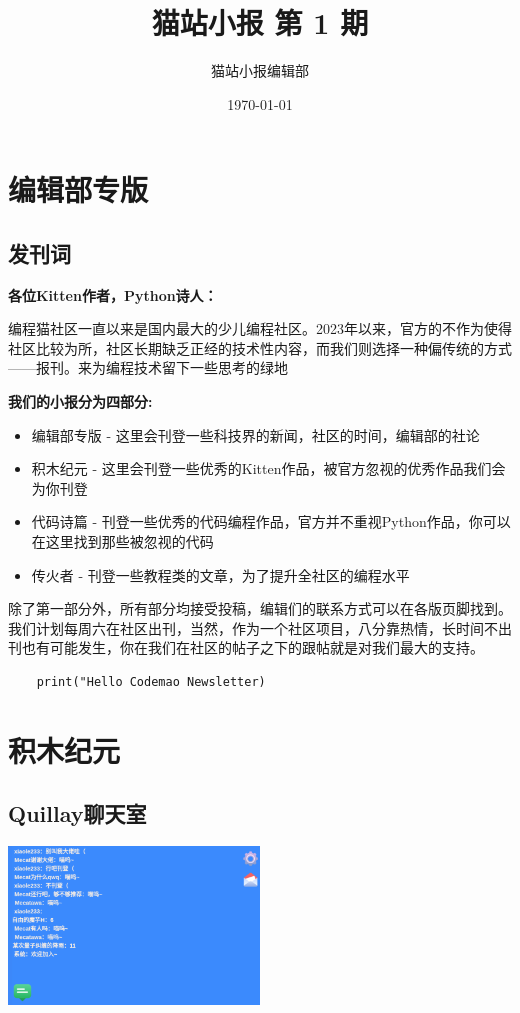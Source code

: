 \documentclass[UTF8,fontset=fandol]{article}
\title{猫站小报 第 1 期}
\author{猫站小报编辑部}
\date{\today}
\begin{document}
\maketitle
\section{编辑部专版}
\subsection{发刊词}

\noindent
\textbf{各位Kitten作者，Python诗人：} 

编程猫社区一直以来是国内最大的少儿编程社区。2023年以来，官方的不作为使得社区比较为所，社区长期缺乏正经的技术性内容，而我们则选择一种偏传统的方式——报刊。来为编程技术留下一些思考的绿地

\noindent
\textbf{我们的小报分为四部分:}

\begin{itemize}
\item 编辑部专版 - 这里会刊登一些科技界的新闻，社区的时间，编辑部的社论
\item 积木纪元 - 这里会刊登一些优秀的Kitten作品，被官方忽视的优秀作品我们会为你刊登
\item 代码诗篇 - 刊登一些优秀的代码编程作品，官方并不重视Python作品，你可以在这里找到那些被忽视的代码
\item 传火者 - 刊登一些教程类的文章，为了提升全社区的编程水平
\end{itemize}

除了第一部分外，所有部分均接受投稿，编辑们的联系方式可以在各版页脚找到。我们计划每周六在社区出刊，当然，作为一个社区项目，八分靠热情，长时间不出刊也有可能发生，你在我们在社区的帖子之下的跟帖就是对我们最大的支持。

\begin{verbatim}
	print("Hello Codemao Newsletter)
\end{verbatim}
\pagebreak

\section{积木纪元}
\subsection{Quillay聊天室}
\includegraphics[width=0.5\textwidth]{assets/01/kitten-1.png}
\end{document}
